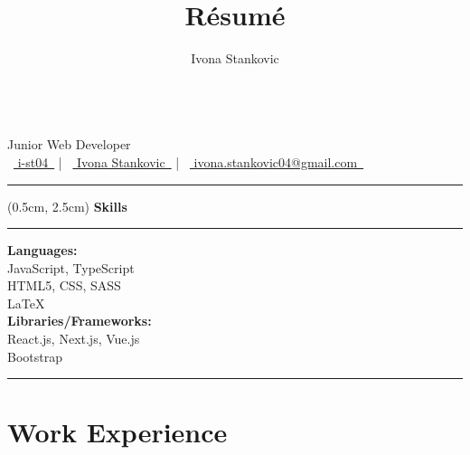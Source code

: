 \documentclass[11pt]{article}
\title{Résumé}
\author{Ivona Stankovic}
\date{}
\makeatletter
\renewcommand{\maketitle}{
  \begin{center}
    {\huge\bfseries \theauthor} \\[0.3em]
    {\large\sffamily Junior Web Developer} \\[0.75em]
   \textcolor{bodytext}{
  \faGithub~\href{https://github.com/i-st04}{ i-st04~\textcolor{gray}{\faExternalLink*}} \quad |
  \faLinkedin~\href{https://www.linkedin.com/in/ivona-stanković-724b0935a/}{ Ivona Stankovic~\textcolor{gray}{\faExternalLink*}} \quad |
  \faEnvelope~\href{mailto:ivona.stankovic04@gmail.com}{ ivona.stankovic04@gmail.com~\textcolor{gray}{\faExternalLink*}}
}
  \end{center}
  \vspace{1em}
  \hrule
}
\makeatother
\begin{document}
\maketitle

\begin{textblock*}{4cm}(0.5cm, 2.5cm) %
\small
\textbf{\large Skills} \\[-0.2em]
\rule{2cm}{0.4pt}

\vspace{0.2em}
\textbf{Languages:} \\
JavaScript, TypeScript \\
HTML5, CSS, SASS \\
\LaTeX \\[0.5em]

\textbf{Libraries/Frameworks:} \\
React.js, Next.js, Vue.js \\
Bootstrap

\vspace{0.3em}
\rule{2cm}{0.4pt}
\end{textblock*}


\section*{Work Experience}

\end{document}

